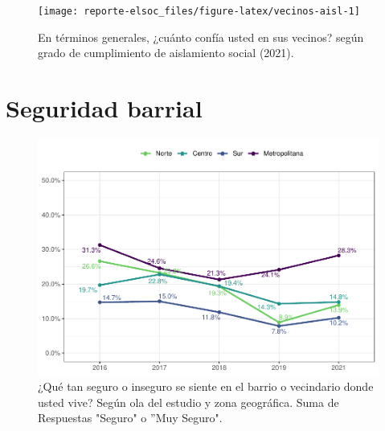 \documentclass[
  12pt,
  openany]{book}
\begin{document}
\begin{figure}

{\centering \texttt{[image: reporte-elsoc\_files/figure-latex/vecinos-aisl-1]} 

}

\caption{En términos generales, ¿cuánto confía usted en sus vecinos? según grado de cumplimiento de aislamiento social (2021).}\label{fig:vecinos-aisl}
\end{figure}

\hypertarget{seguridad-barrial}{%
\section{Seguridad barrial}\label{seguridad-barrial}}

\begin{figure}

{\centering \includegraphics{reporte-elsoc_files/figure-latex/seguri-zona-1} 

}

\caption{¿Qué tan seguro o inseguro se siente en el barrio o vecindario donde usted vive? Según ola del estudio y zona geográfica. Suma de Respuestas "Seguro" o ”Muy Seguro".}\label{fig:seguri-zona}
\end{figure}
\end{document}
